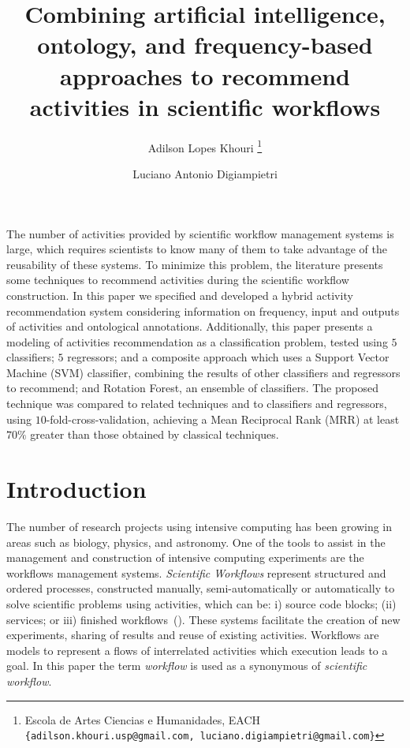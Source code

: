 \documentclass{RITA}
\title{Combining artificial intelligence, ontology, and frequency-based approaches to recommend activities in scientific workflows}
\author{
Adilson Lopes Khouri
\footnote{Escola de Artes Ciencias e Humanidades, EACH\\
  \texttt{\{adilson.khouri.usp@gmail.com, luciano.digiampietri@gmail.com\}}}
\and
Luciano Antonio Digiampietri
\footnotemark[1]
}
\begin{document}
\maketitle

\begin{abstractinenglish}
The number of activities provided by scientific workflow management systems is large, which requires scientists to know many of them to take advantage of the reusability of these systems. To minimize this problem, the literature presents some techniques to recommend activities during the scientific workflow construction. In this paper we specified and developed a hybrid activity recommendation system considering information on frequency, input and outputs of activities and ontological annotations. Additionally, this paper presents a modeling of activities recommendation as a classification problem, tested using \(5\) classifiers; \(5\) regressors; and a composite approach which uses a Support Vector Machine (SVM) classifier, combining the results of other classifiers and regressors to recommend; and Rotation Forest, an ensemble of classifiers. The proposed technique was compared to related techniques and to classifiers and regressors, using \(10\)-fold-cross-validation, achieving a Mean Reciprocal Rank (MRR) at least \(70\%\) greater than those obtained by classical techniques.
\end{abstractinenglish}

\section{Introduction}
The number of research projects using intensive computing has been growing in areas such as biology, physics, and astronomy. One of the tools to assist in the management and construction of intensive computing experiments are the workflows management systems. \emph{Scientific Workflows} represent structured and ordered processes, constructed manually, semi-automatically or automatically to solve scientific problems using activities, which can be: i) source code blocks; (ii) services; or iii) finished workflows~(\cite{Wang2010}). These systems facilitate the creation of new experiments, sharing of results and reuse of existing activities. Workflows are models to represent a flows of interrelated activities which execution leads to a goal. In this paper the term \emph{workflow} is used as a synonymous of \emph{scientific workflow}.


\end{document}
